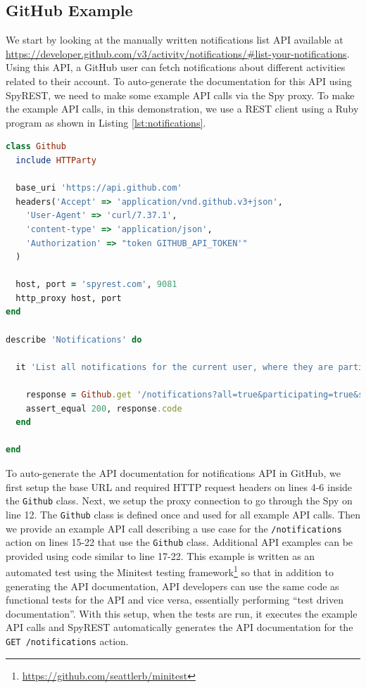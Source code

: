 \documentclass[conference]{IEEEtran}
\begin{document}
\subsection{GitHub Example} %
\label{sub:github_example}


We start by looking at the manually written notifications list API available at \url{https://developer.github.com/v3/activity/notifications/#list-your-notifications}. Using this API, a GitHub user can fetch notifications about different activities related to their account. To auto-generate the documentation for this API using SpyREST, we need to make some example API calls via the Spy proxy. To make the example API calls, in this demonstration, we use a REST client using a Ruby program as shown in Listing \ref{lst:notifications}.

\begin{lstlisting}[language=ruby, breaklines=true, caption={}, label=list:ex, float,floatplacement=H, caption=Example API call using SpyREST, label={lst:notifications}]
class Github
  include HTTParty

  base_uri 'https://api.github.com'
  headers('Accept' => 'application/vnd.github.v3+json',
    'User-Agent' => 'curl/7.37.1',
    'content-type' => 'application/json',
    'Authorization' => "token GITHUB_API_TOKEN'"
  )

  host, port = 'spyrest.com', 9081
  http_proxy host, port
end

describe 'Notifications' do

  it 'List all notifications for the current user, where they are participating, since a time' do

    response = Github.get '/notifications?all=true&participating=true&since=2014-01-01T00:00:00Z'
    assert_equal 200, response.code
  end

end\end{lstlisting}


To auto-generate the API documentation for notifications API in GitHub, we first setup the base URL and required HTTP request headers on lines 4-6 inside the \texttt{Github} class. Next, we setup the proxy connection to go through the Spy on line 12. The \texttt{Github} class is defined once and used for all example API calls. Then we provide an example API call describing a use case for the \texttt{/notifications} action on lines 15-22 that use the \texttt{Github} class. Additional API examples can be provided using code similar to line 17-22. This example is written as an automated test using the Minitest testing framework\footnote{\url{https://github.com/seattlerb/minitest}} so that in addition to generating the API documentation, API developers can use the same code as functional tests for the API and vice versa, essentially performing ``test driven documentation''. With this setup, when the tests are run, it executes the example API calls and SpyREST automatically generates the API documentation for the \texttt{GET /notifications} action.
\end{document}
